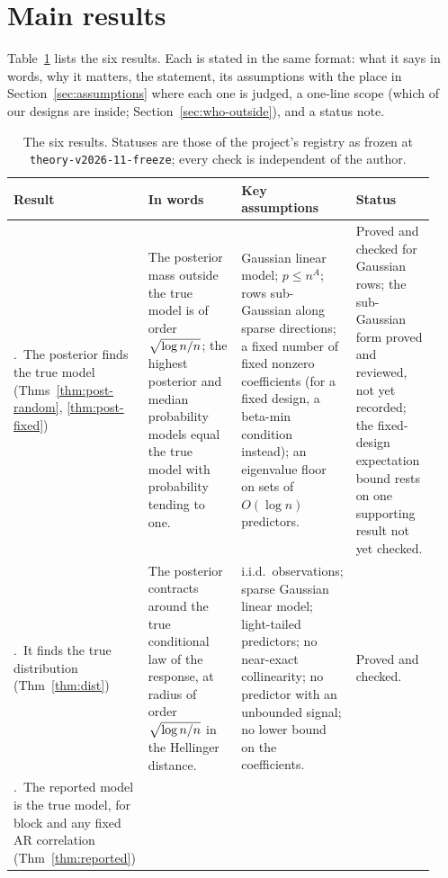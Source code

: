 \section{Main results}\label{sec:results}

Table~\ref{tab:results} lists the six results. Each is stated in the same format: what it says in words, why it
matters, the statement, its assumptions with the place in Section~\ref{sec:assumptions} where each one is judged, a
one-line scope (which of our designs are inside; Section~\ref{sec:who-outside}), and a status note.

\begin{table}[!t]
\centering\footnotesize
\setlength{\tabcolsep}{3.5pt}
\renewcommand{\arraystretch}{1.12}
\caption{The six results. Statuses are those of the project's registry as frozen at \texttt{theory-v2026-11-freeze};
every check is independent of the author.}\label{tab:results}
\begin{tabular}{@{}>{\raggedright\arraybackslash}p{0.17\linewidth}>{\raggedright\arraybackslash}p{0.3\linewidth}>{\raggedright\arraybackslash}p{0.26\linewidth}>{\raggedright\arraybackslash}p{0.2\linewidth}@{}}
\toprule
Result & In words & Key assumptions & Status \\
\midrule
1.~The posterior finds the true model (Thms~\ref{thm:post-random}, \ref{thm:post-fixed}) &
The posterior mass outside the true model is of order $\sqrt{\log n/n}$; the highest posterior and median probability models equal
the true model with probability tending to one. &
Gaussian linear model; $p\le n^A$; rows sub-Gaussian along sparse directions; a fixed number of fixed nonzero
coefficients (for a fixed design, a beta-min condition instead); an eigenvalue floor on sets of $O(\log n)$ predictors. &
Proved and checked for Gaussian rows; the sub-Gaussian form proved and reviewed, not yet recorded; the fixed-design expectation bound rests on one supporting
result not yet checked. \\
2.~It finds the true distribution (Thm~\ref{thm:dist}) &
The posterior contracts around the true conditional law of the response, at radius of order $\sqrt{\log n/n}$ in the Hellinger distance. &
i.i.d.\ observations; sparse Gaussian linear model; light-tailed predictors; no near-exact collinearity; no predictor with an unbounded
signal; no lower bound on the coefficients. &
Proved and checked. \\
3.~The reported model is the true model, for block and any fixed AR correlation (Thm~\ref{thm:reported}) &

\end{tabular}
\end{table}
